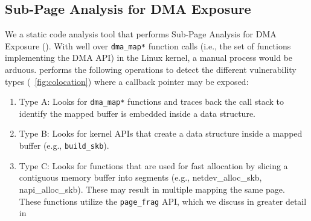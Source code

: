 \subsection{Sub-Page Analysis for DMA Exposure}\label{sec:static-analysis}

We \DIFdelbegin {}\DIFdelend \DIFaddbegin {}\DIFaddend a static code analysis tool that performs Sub-Page Analysis for DMA Exposure (\tool). With well over \DIFdelbegin {} \texttt{dma\_map*} function calls (i.e., the set of functions implementing the DMA API) \DIFdelbegin \DIFdel{, }\DIFdelend in the Linux kernel, a manual process would be arduous. \tool performs the following operations to detect the different \subpage{} vulnerability types (\DIFdelbegin {}\DIFdelend \DIFaddbegin {}\DIFaddend ~\ref{fig:colocation}) where a callback pointer may be exposed:
\begin{enumerate}
    \item Type A: Looks for \texttt{dma\_map*} functions and traces back the call stack to identify \DIFdelbegin {}\DIFdelend \DIFaddbegin {}\DIFaddend the mapped buffer is embedded inside a data structure.
    \item Type B: Looks for kernel APIs that create a data structure inside a mapped buffer (e.g., \texttt{build\_skb}).
    \item Type C: Looks for functions that are used for fast allocation by slicing a contiguous memory buffer into segments (e.g., netdev\_alloc\_skb, napi\_alloc\_skb). These may result in multiple \iova mapping the same page. These functions utilize the \texttt{page\_frag} API, which we discuss in greater detail in \DIFdelbegin {}\DIFdelend \DIFaddbegin {}\DIFaddend \end{enumerate}



